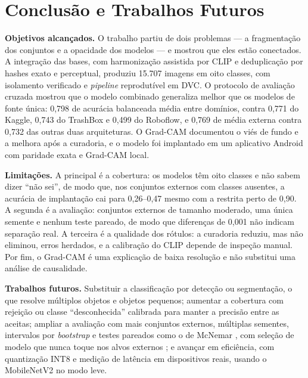 \documentclass[11pt,a4paper]{article}
\begin{document}
	\section{Conclusão e Trabalhos Futuros}
	\label{sec:conclusao}
	
	\textbf{Objetivos alcançados.} O trabalho partiu de dois problemas --- a fragmentação dos conjuntos e a opacidade dos modelos --- e mostrou que eles estão conectados. A integração das bases, com harmonização assistida por CLIP e deduplicação por hashes exato e perceptual, produziu 15.707 imagens em oito classes, com isolamento verificado e \emph{pipeline} reprodutível em DVC. O protocolo de avaliação cruzada mostrou que o modelo combinado generaliza melhor que os modelos de fonte única: 0,798 de acurácia balanceada média entre domínios, contra 0,771 do Kaggle, 0,743 do TrashBox e 0,499 do Roboflow, e 0,769 de média externa contra 0,732 das outras duas arquiteturas. O Grad-CAM documentou o viés de fundo e a melhora após a curadoria, e o modelo foi implantado em um aplicativo Android com paridade exata e Grad-CAM local.
	
	\textbf{Limitações.} A principal é a cobertura: os modelos têm oito classes e não sabem dizer ``não sei'', de modo que, nos conjuntos externos com classes ausentes, a acurácia de implantação cai para 0,26--0,47 mesmo com a restrita perto de 0,90. A segunda é a avaliação: conjuntos externos de tamanho moderado, uma única semente e nenhum teste pareado, de modo que diferenças de 0,001 não indicam separação real. A terceira é a qualidade dos rótulos: a curadoria reduziu, mas não eliminou, erros herdados, e a calibração do CLIP depende de inspeção manual. Por fim, o Grad-CAM é uma explicação de baixa resolução e não substitui uma análise de causalidade.
	
	\textbf{Trabalhos futuros.} Substituir a classificação por detecção ou segmentação, o que resolve múltiplos objetos e objetos pequenos; aumentar a cobertura com rejeição ou classe ``desconhecida'' calibrada para manter a precisão entre as aceitas; ampliar a avaliação com mais conjuntos externos, múltiplas sementes, intervalos por \emph{bootstrap} e testes pareados como o de McNemar \cite{dietterich1998}, com seleção de modelo que nunca toque nos alvos externos \cite{gulrajani2021}; e avançar em eficiência, com quantização INT8 e medição de latência em dispositivos reais, usando o MobileNetV2 no modo leve.
	
\end{document}
